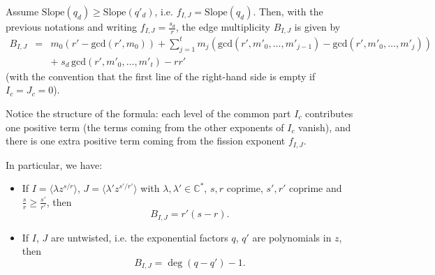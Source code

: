 \documentclass[11pt,a4paper]{amsart}
\numberwithin{equation}{section}
\newcommand{\cir}[1]{\langle #1 \rangle}
\begin{document}
\begin{lemma}
\label{lemma:formula_edge_multiplicity}
Assume $\mathrm{Slope}(q_d)\geq \mathrm{Slope}(q'_d)$, i.e. $f_{I,J}=\mathrm{Slope}(q_d)$. Then, with the previous notations and writing $f_{I,J}=\frac{s_d}{r}$, the edge multiplicity $B_{I,J}$ is given by
\begin{equation}
\begin{array}{lll}
B_{I,J} &=& m_0(r'-\mathrm{gcd}(r',m_0))+ \sum_{j=1}^t  m_j\left(\mathrm{gcd}(r', m'_0, \dots, m'_{j-1})-\mathrm{gcd}(r', m'_0,\dots,m'_j)\right)\\
& & + \; s_{d}\,\mathrm{gcd}(r', m'_0,\dots,m'_t)-rr'
\end{array}
\end{equation}
(with the convention that the first line of the right-hand side is empty if $I_c=J_c=0$).
\end{lemma}

Notice the structure of the formula: each level of the common part $I_c$ contributes one positive term (the terms coming from the other exponents of $I_c$ vanish), and there is one extra positive term coming from the fission exponent $f_{I,J}$. 

\begin{remark}
In particular, we have:
\begin{itemize}
\item If $I=\cir{\lambda z^{s/r}}$, $J=\cir{\lambda' z^{s'/r'}}$ with $\lambda, \lambda'\in\mathbb C^*$,  $s, r$ coprime, $s',r'$ coprime and $\frac{s}{r}\geq \frac{s'}{r'}$, then
\begin{equation}
B_{I,J}=r'(s-r).
\end{equation}
\item If $I$, $J$ are untwisted, i.e. the exponential factors $q$, $q'$ are polynomials in $z$, then 
\begin{equation}
B_{I,J}=\deg(q-q')-1.
\end{equation}
\end{itemize}
\end{remark}
\end{document}
